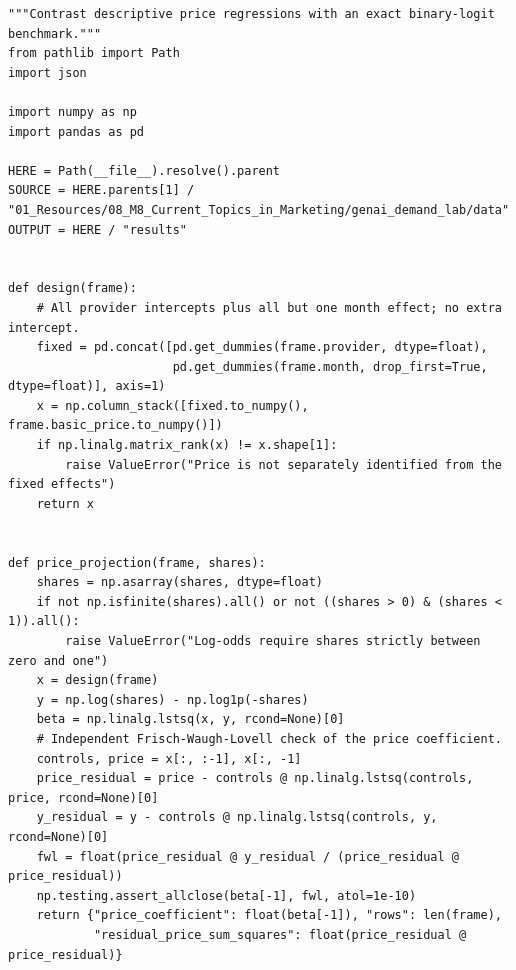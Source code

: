 \begin{Verbatim}[breaklines,breakanywhere,fontsize=\small]
"""Contrast descriptive price regressions with an exact binary-logit benchmark."""
from pathlib import Path
import json

import numpy as np
import pandas as pd

HERE = Path(__file__).resolve().parent
SOURCE = HERE.parents[1] / "01_Resources/08_M8_Current_Topics_in_Marketing/genai_demand_lab/data"
OUTPUT = HERE / "results"


def design(frame):
    # All provider intercepts plus all but one month effect; no extra intercept.
    fixed = pd.concat([pd.get_dummies(frame.provider, dtype=float),
                       pd.get_dummies(frame.month, drop_first=True, dtype=float)], axis=1)
    x = np.column_stack([fixed.to_numpy(), frame.basic_price.to_numpy()])
    if np.linalg.matrix_rank(x) != x.shape[1]:
        raise ValueError("Price is not separately identified from the fixed effects")
    return x


def price_projection(frame, shares):
    shares = np.asarray(shares, dtype=float)
    if not np.isfinite(shares).all() or not ((shares > 0) & (shares < 1)).all():
        raise ValueError("Log-odds require shares strictly between zero and one")
    x = design(frame)
    y = np.log(shares) - np.log1p(-shares)
    beta = np.linalg.lstsq(x, y, rcond=None)[0]
    # Independent Frisch-Waugh-Lovell check of the price coefficient.
    controls, price = x[:, :-1], x[:, -1]
    price_residual = price - controls @ np.linalg.lstsq(controls, price, rcond=None)[0]
    y_residual = y - controls @ np.linalg.lstsq(controls, y, rcond=None)[0]
    fwl = float(price_residual @ y_residual / (price_residual @ price_residual))
    np.testing.assert_allclose(beta[-1], fwl, atol=1e-10)
    return {"price_coefficient": float(beta[-1]), "rows": len(frame),
            "residual_price_sum_squares": float(price_residual @ price_residual)}



\end{Verbatim}
